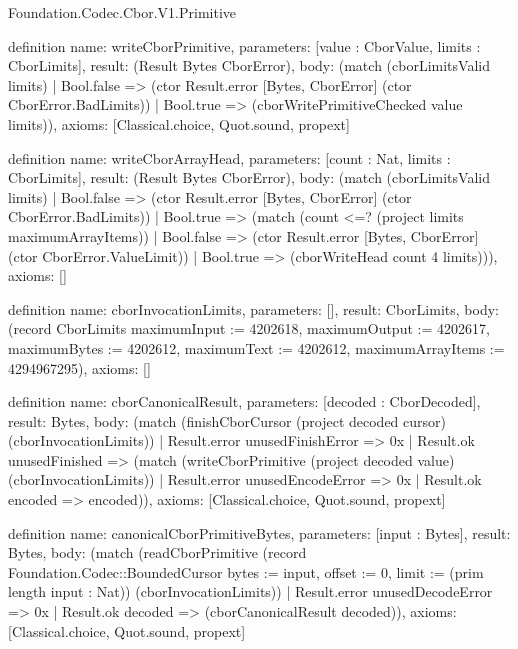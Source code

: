 \begin{lexlean}{Foundation.Codec.Cbor.V1.Primitive}
\begin{semanticmodule}
definition{
  name: writeCborPrimitive,
  parameters: [value : CborValue, limits : CborLimits],
  result: (Result Bytes CborError),
  body: (match (cborLimitsValid limits)
    | Bool.false => (ctor Result.error [Bytes, CborError] (ctor CborError.BadLimits))
    | Bool.true => (cborWritePrimitiveChecked value limits)),
  axioms: [Classical.choice, Quot.sound, propext]
}

definition{
  name: writeCborArrayHead,
  parameters: [count : Nat, limits : CborLimits],
  result: (Result Bytes CborError),
  body: (match (cborLimitsValid limits)
    | Bool.false => (ctor Result.error [Bytes, CborError] (ctor CborError.BadLimits))
    | Bool.true => (match (count <=? (project limits maximumArrayItems))
      | Bool.false => (ctor Result.error [Bytes, CborError] (ctor CborError.ValueLimit))
      | Bool.true => (cborWriteHead count 4 limits))),
  axioms: []
}

definition{
  name: cborInvocationLimits,
  parameters: [],
  result: CborLimits,
  body: (record CborLimits {maximumInput := 4202618, maximumOutput := 4202617, maximumBytes := 4202612, maximumText := 4202612, maximumArrayItems := 4294967295}),
  axioms: []
}

definition{
  name: cborCanonicalResult,
  parameters: [decoded : CborDecoded],
  result: Bytes,
  body: (match (finishCborCursor (project decoded cursor) (cborInvocationLimits))
    | Result.error unusedFinishError => 0x
    | Result.ok unusedFinished => (match (writeCborPrimitive (project decoded value) (cborInvocationLimits))
      | Result.error unusedEncodeError => 0x
      | Result.ok encoded => encoded)),
  axioms: [Classical.choice, Quot.sound, propext]
}

definition{
  name: canonicalCborPrimitiveBytes,
  parameters: [input : Bytes],
  result: Bytes,
  body: (match (readCborPrimitive (record Foundation.Codec::BoundedCursor {bytes := input, offset := 0, limit := (prim length input : Nat)}) (cborInvocationLimits))
    | Result.error unusedDecodeError => 0x
    | Result.ok decoded => (cborCanonicalResult decoded)),
  axioms: [Classical.choice, Quot.sound, propext]
}
\end{semanticmodule}
\end{lexlean}
